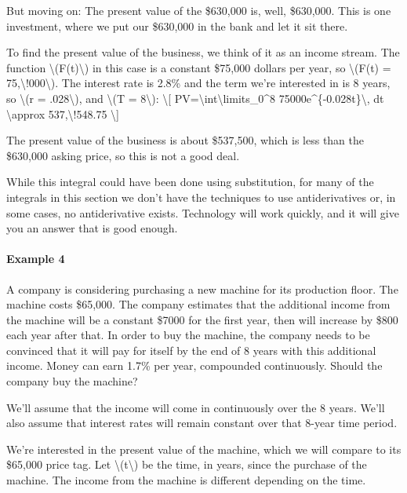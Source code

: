 But moving on: The present value of the \$630,000 is, well, \$630,000.
This is one investment, where we put our \$630,000 in the bank and let
it sit there.

To find the present value of the business, we think of it as an income
stream. The function \textbackslash{}(F(t)\textbackslash{}) in this case
is a constant \$75,000 dollars per year, so \textbackslash{}(F(t) =
75,\textbackslash{}!000\textbackslash{}). The interest rate is 2.8\% and
the term we're interested in is 8 years, so \textbackslash{}(r =
.028\textbackslash{}), and \textbackslash{}(T = 8\textbackslash{}):
\textbackslash{}{[} PV=\textbackslash{}int\textbackslash{}limits\_0\^{}8
75000e\^{}\{-0.028t\}\textbackslash{}, dt \textbackslash{}approx
537,\textbackslash{}!548.75 \textbackslash{}{]}

The present value of the business is about \$537,500, which is less than
the \$630,000 asking price, so this is not a good deal.

While this integral could have been done using substitution, for many of
the integrals in this section we don't have the techniques to use
antiderivatives or, in some cases, no antiderivative exists. Technology
will work quickly, and it will give you an answer that is good enough.

\hypertarget{example-4}{%
\paragraph{Example 4}\label{example-4}}

A company is considering purchasing a new machine for its production
floor. The machine costs \$65,000. The company estimates that the
additional income from the machine will be a constant \$7000 for the
first year, then will increase by \$800 each year after that. In order
to buy the machine, the company needs to be convinced that it will pay
for itself by the end of 8 years with this additional income. Money can
earn 1.7\% per year, compounded continuously. Should the company buy the
machine?

We'll assume that the income will come in continuously over the 8 years.
We'll also assume that interest rates will remain constant over that
8-year time period.

We're interested in the present value of the machine, which we will
compare to its \$65,000 price tag. Let
\textbackslash{}(t\textbackslash{}) be the time, in years, since the
purchase of the machine. The income from the machine is different
depending on the time.

